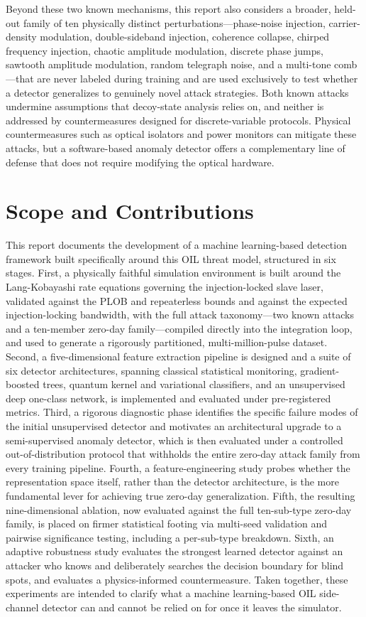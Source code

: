 \documentclass[12pt, a4paper]{report}
\begin{document}
Beyond these two known mechanisms, this report also considers a broader, held-out family of ten physically distinct perturbations—phase-noise injection, carrier-density modulation, double-sideband injection, coherence collapse, chirped frequency injection, chaotic amplitude modulation, discrete phase jumps, sawtooth amplitude modulation, random telegraph noise, and a multi-tone comb—that are never labeled during training and are used exclusively to test whether a detector generalizes to genuinely novel attack strategies. Both known attacks undermine assumptions that decoy-state analysis relies on, and neither is addressed by countermeasures designed for discrete-variable protocols. Physical countermeasures such as optical isolators and power monitors can mitigate these attacks, but a software-based anomaly detector offers a complementary line of defense that does not require modifying the optical hardware.

\section{Scope and Contributions}
This report documents the development of a machine learning-based detection framework built specifically around this OIL threat model, structured in six stages. First, a physically faithful simulation environment is built around the Lang-Kobayashi rate equations governing the injection-locked slave laser, validated against the PLOB and repeaterless bounds and against the expected injection-locking bandwidth, with the full attack taxonomy—two known attacks and a ten-member zero-day family—compiled directly into the integration loop, and used to generate a rigorously partitioned, multi-million-pulse dataset. Second, a five-dimensional feature extraction pipeline is designed and a suite of six detector architectures, spanning classical statistical monitoring, gradient-boosted trees, quantum kernel and variational classifiers, and an unsupervised deep one-class network, is implemented and evaluated under pre-registered metrics. Third, a rigorous diagnostic phase identifies the specific failure modes of the initial unsupervised detector and motivates an architectural upgrade to a semi-supervised anomaly detector, which is then evaluated under a controlled out-of-distribution protocol that withholds the entire zero-day attack family from every training pipeline. Fourth, a feature-engineering study probes whether the representation space itself, rather than the detector architecture, is the more fundamental lever for achieving true zero-day generalization. Fifth, the resulting nine-dimensional ablation, now evaluated against the full ten-sub-type zero-day family, is placed on firmer statistical footing via multi-seed validation and pairwise significance testing, including a per-sub-type breakdown. Sixth, an adaptive robustness study evaluates the strongest learned detector against an attacker who knows and deliberately searches the decision boundary for blind spots, and evaluates a physics-informed countermeasure. Taken together, these experiments are intended to clarify what a machine learning-based OIL side-channel detector can and cannot be relied on for once it leaves the simulator.
\end{document}

